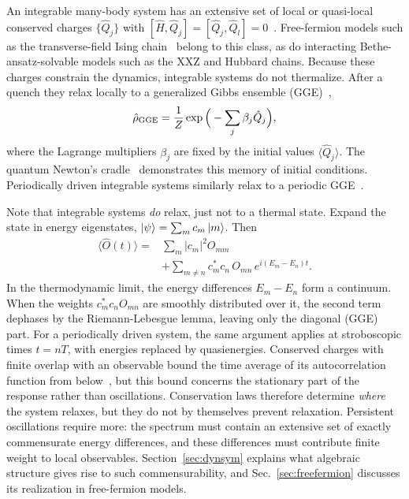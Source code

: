 \documentclass[%
reprint,
superscriptaddress,
amsmath,amssymb,
aps,
prb,
showkeys,%
floatfix,
]{revtex4-2}
\let\cite\citep   %
\begin{document}
	An integrable many-body system has an extensive set of local or quasi-local conserved charges $\{\hat{Q}_j\}$ with $[\hat{H},\hat{Q}_j]=[\hat{Q}_j,\hat{Q}_l]=0$~\cite{EsslerFagotti2016,IlievskiQuasilocal2016}. Free-fermion models such as the transverse-field Ising chain~\cite{LSM1961,Pfeuty1970} belong to this class, as do interacting Bethe-ansatz-solvable models such as the XXZ and Hubbard chains. Because these charges constrain the dynamics, integrable systems do not thermalize. After a quench they relax locally to a generalized Gibbs ensemble (GGE)~\cite{Rigol2007,VidmarRigol2016,Ilievski2015GGE},
	\begin{equation}
		\hat{\rho}_{\rm GGE}=\frac{1}{Z}\exp\Big(-\sum_j\beta_j\hat{Q}_j\Big),
		\label{eq:GGE}
	\end{equation}
	where the Lagrange multipliers $\beta_j$ are fixed by the initial values $\langle\hat{Q}_j\rangle$. The quantum Newton's cradle~\cite{Kinoshita2006} demonstrates this memory of initial conditions. Periodically driven integrable systems similarly relax to a periodic GGE~\cite{LazaridesDasMoessner2014PRL}.
	
	Note that integrable systems \emph{do} relax, just not to a thermal state. Expand the state in energy eigenstates, $\ket{\psi}=\sum_m c_m\ket{m}$. Then
	\begin{equation}\label{eq:dephasing}
		\begin{split}
			\langle\hat{O}(t)\rangle={}&\sum_m|c_m|^2O_{mm}\\
			&+\sum_{m\neq n}c_m^*c_n\,O_{mn}\,e^{i(E_m-E_n)t}.
		\end{split}
	\end{equation}
	In the thermodynamic limit, the energy differences $E_m-E_n$ form a continuum. When the weights $c_m^*c_nO_{mn}$ are smoothly distributed over it, the second term dephases by the Riemann-Lebesgue lemma, leaving only the diagonal (GGE) part. For a periodically driven system, the same argument applies at stroboscopic times $t=nT$, with energies replaced by quasienergies. Conserved charges with finite overlap with an observable bound the time average of its autocorrelation function from below~\cite{Mazur1969,Suzuki1971}, but this bound concerns the stationary part of the response rather than oscillations. Conservation laws therefore determine \emph{where} the system relaxes, but they do not by themselves prevent relaxation. Persistent oscillations require more: the spectrum must contain an extensive set of exactly commensurate energy differences, and these differences must contribute finite weight to local observables. Section~\ref{sec:dynsym} explains what algebraic structure gives rise to such commensurability, and Sec.~\ref{sec:freefermion} discusses its realization in free-fermion models.
	
\end{document}
